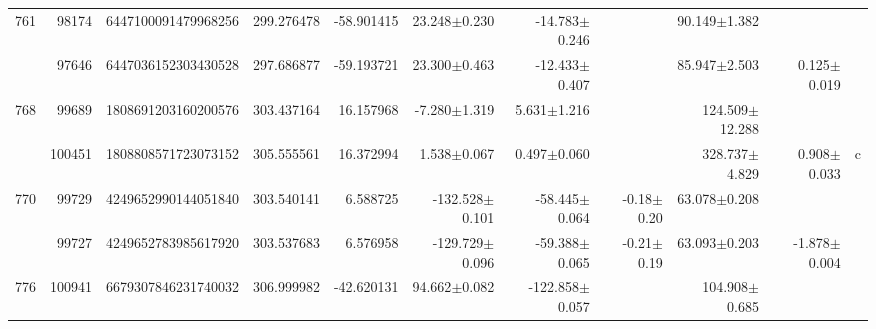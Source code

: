 \documentclass{ws-ijmpd}
\begin{document}
\begin{landscape}
\begin{longtable}{rrrrrrrrrrl}
 \hline 761 &   98174 &      6447100091479968256 &                   299.276478 &                   -58.901415 &                 23.248$\pm$0.230 &                -14.783$\pm$0.246 &                           &        90.149$\pm$1.382 &                                           &                                                    \\
            &   97646 &      6447036152303430528 &                   297.686877 &                   -59.193721 &                 23.300$\pm$0.463 &                -12.433$\pm$0.407 &                           &        85.947$\pm$2.503 &                           0.125$\pm$0.019 &                                                    \\
 \hline 768 &   99689 &      1808691203160200576 &                   303.437164 &                    16.157968 &                 -7.280$\pm$1.319 &                  5.631$\pm$1.216 &                           &      124.509$\pm$12.288 &                                           &                                                    \\
            &  100451 &      1808808571723073152 &                   305.555561 &                    16.372994 &                  1.538$\pm$0.067 &                  0.497$\pm$0.060 &                           &       328.737$\pm$4.829 &                           0.908$\pm$0.033 &                                                  c \\
 \hline 770 &   99729 &      4249652990144051840 &                   303.540141 &                     6.588725 &               -132.528$\pm$0.101 &                -58.445$\pm$0.064 &          -0.18$\pm$  0.20 &        63.078$\pm$0.208 &                                           &                                                    \\
            &   99727 &      4249652783985617920 &                   303.537683 &                     6.576958 &               -129.729$\pm$0.096 &                -59.388$\pm$0.065 &          -0.21$\pm$  0.19 &        63.093$\pm$0.203 &                          -1.878$\pm$0.004 &                                                    \\
 \hline 776 &  100941 &      6679307846231740032 &                   306.999982 &                   -42.620131 &                 94.662$\pm$0.082 &               -122.858$\pm$0.057 &                           &       104.908$\pm$0.685 &                                           &                                                    \\

\end{longtable}
\end{landscape}
\end{document}
